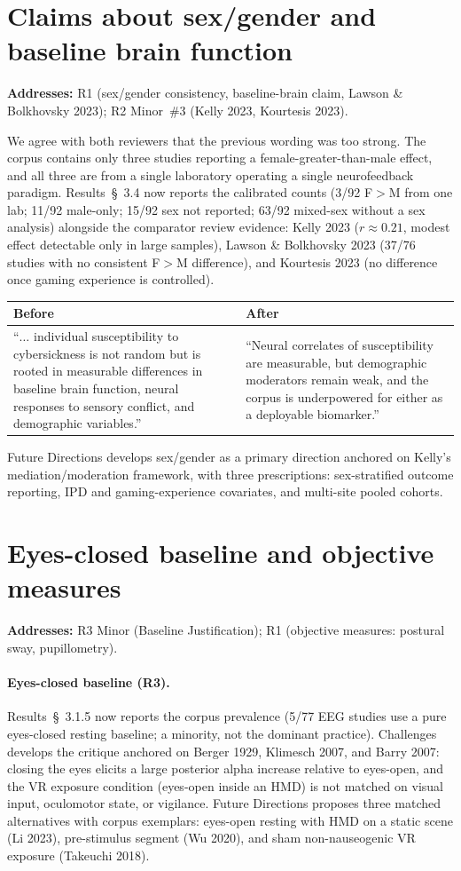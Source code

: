 \documentclass[11pt,a4paper]{article}
\makeatletter
\newcommand{\diffbox}[2]{%
  \begin{center}
  \small
  \begin{tabular}{@{}p{0.46\textwidth}@{\hspace{2em}}p{0.46\textwidth}@{}}
  \toprule
  \textbf{Before} & \textbf{After} \\
  \midrule
  #1 & #2 \\
  \bottomrule
  \end{tabular}
  \end{center}}
\newcommand{\addresses}[1]{\par\noindent\textbf{\small Addresses:} {\small #1}\par\smallskip}
\makeatother
\begin{document}
\section{Claims about sex/gender and baseline brain function}\label{sec:gender}
\addresses{R1 (sex/gender consistency, baseline-brain claim, Lawson \& Bolkhovsky 2023); R2 Minor~\#3 (Kelly 2023, Kourtesis 2023).}

We agree with both reviewers that the previous wording was too strong. The corpus contains only three studies reporting a female-greater-than-male effect, and all three are from a single laboratory operating a single neurofeedback paradigm. Results~\S~3.4 now reports the calibrated counts (3/92 F$>$M from one lab; 11/92 male-only; 15/92 sex not reported; 63/92 mixed-sex without a sex analysis) alongside the comparator review evidence: Kelly 2023 ($r \approx 0.21$, modest effect detectable only in large samples), Lawson \& Bolkhovsky 2023 (37/76 studies with no consistent F$>$M difference), and Kourtesis 2023 (no difference once gaming experience is controlled).

\diffbox{``$\ldots$ individual susceptibility to cybersickness is not random but is rooted in measurable differences in baseline brain function, neural responses to sensory conflict, and demographic variables.''}{``Neural correlates of susceptibility are measurable, but demographic moderators remain weak, and the corpus is underpowered for either as a deployable biomarker.''}

\noindent Future Directions develops sex/gender as a primary direction anchored on Kelly's mediation/moderation framework, with three prescriptions: sex-stratified outcome reporting, IPD and gaming-experience covariates, and multi-site pooled cohorts.

\section{Eyes-closed baseline and objective measures}\label{sec:baseline}
\addresses{R3 Minor (Baseline Justification); R1 (objective measures: postural sway, pupillometry).}

\paragraph{Eyes-closed baseline (R3).} Results~\S~3.1.5 now reports the corpus prevalence (5/77 EEG studies use a pure eyes-closed resting baseline; a minority, not the dominant practice). Challenges develops the critique anchored on Berger 1929, Klimesch 2007, and Barry 2007: closing the eyes elicits a large posterior alpha increase relative to eyes-open, and the VR exposure condition (eyes-open inside an HMD) is not matched on visual input, oculomotor state, or vigilance. Future Directions proposes three matched alternatives with corpus exemplars: eyes-open resting with HMD on a static scene (Li 2023), pre-stimulus segment (Wu 2020), and sham non-nauseogenic VR exposure (Takeuchi 2018).
\end{document}

